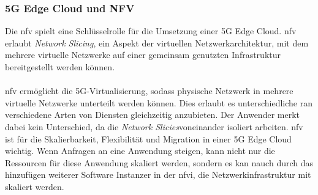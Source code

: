\documentclass[runningheads]{llncs}
\numberwithin{figure}{section}
\begin{document}
\subsubsection{5G Edge Cloud und NFV}
Die \acrlong{nfv} spielt eine Schlüsselrolle für die Umsetzung einer 5G Edge Cloud.
\acrshort{nfv} erlaubt \textit{Network Slicing}, ein Aspekt der virtuellen Netzwerkarchitektur, 
mit dem mehrere virtuelle Netzwerke auf einer gemeinsam genutzten Infrastruktur bereitgestellt werden können.
\\
\\
\acrshort{nfv} ermöglicht die 5G-Virtualisierung, sodass physische Netzwerk in mehrere virtuelle Netzwerke unterteilt werden können. 
Dies erlaubt es unterschiedliche \acrfull{ran} verschiedene Arten von Diensten gleichzeitig anzubieten. 
Der Anwender merkt dabei kein Unterschied, da die \textit{Network Slicies}voneinander isoliert arbeiten. 
\acrshort{nfv} ist für die Skalierbarkeit, Flexibilität und Migration in einer 5G Edge Cloud wichtig. Wenn Anfragen an eine
Anwendung steigen, kann nicht nur die Ressourcen für diese Anwendung skaliert werden, sondern es kan nauch durch das hinzufügen weiterer
Software Instanzer in der \acrfull{nfvi}, die Netzwerkinfrastruktur mit skaliert werden. \cite{How5GNFV} 
\end{document}
